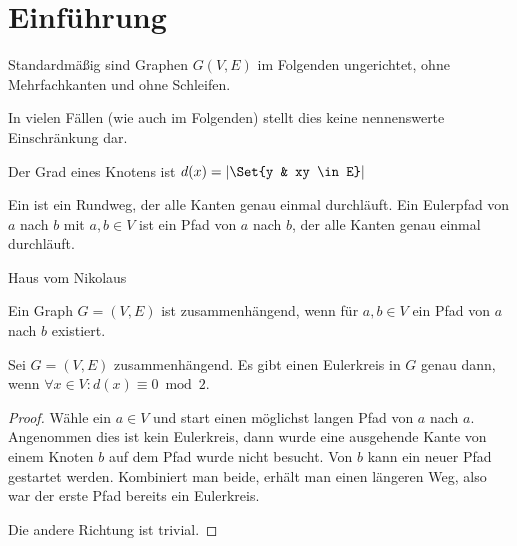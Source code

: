 \chapter{Einführung}


\begin{conv}
    Standardmäßig sind Graphen $G(V, E)$ im Folgenden ungerichtet, ohne Mehrfachkanten und ohne Schleifen.
\end{conv}

In vielen Fällen (wie auch im Folgenden) stellt dies keine nennenswerte Einschränkung dar.

\begin{df}
    Der Grad eines Knotens ist
    \begin{math}
        d(x) = |\Set{y & xy \in E}|
    \end{math}
\end{df}

\begin{df}
    Ein  ist ein Rundweg, der alle Kanten genau einmal durchläuft.
    Ein Eulerpfad von $a$ nach $b$ mit $a,b \in V$ ist ein Pfad von $a$ nach $b$, der alle Kanten genau einmal durchläuft.
\end{df}

\begin{ex}
    Haus vom Nikolaus
\end{ex}

\begin{df}
    Ein Graph $G = (V, E)$ ist zusammenhängend, wenn für $a,b \in V$ ein Pfad von $a$ nach $b$ existiert.
\end{df}


\begin{st}
    Sei $G = (V, E)$ zusammenhängend.
    Es gibt einen Eulerkreis in $G$ genau dann, wenn $\forall x \in V: d(x) \equiv 0 \bmod 2$.
    \begin{proof}
        Wähle ein $a \in V$ und start einen möglichst langen Pfad von $a$ nach $a$.
        Angenommen dies ist kein Eulerkreis, dann wurde eine ausgehende Kante von einem Knoten $b$ auf dem Pfad wurde nicht besucht.
        Von $b$ kann ein neuer Pfad gestartet werden.
        Kombiniert man beide, erhält man einen längeren Weg, also war der erste Pfad bereits ein Eulerkreis.

        Die andere Richtung ist trivial.
    \end{proof}
\end{st}

